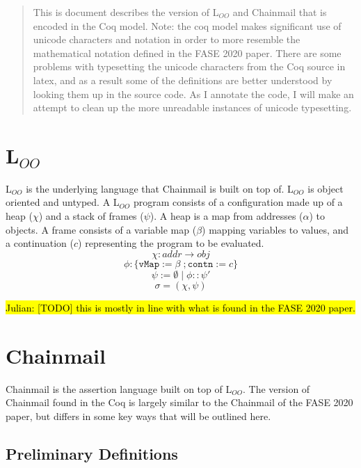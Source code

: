 \documentclass[12pt]{article}
\begin{document}
\maketitle

\begin{abstract}
This is document describes the version of L$_{OO}$ and Chainmail that is encoded in the Coq model.  
Note: the coq model makes significant use of unicode characters and notation in order to more resemble
the mathematical notation defined in the FASE 2020 paper. There are some problems with typesetting the
unicode characters from the Coq source in latex, and as a result some of the definitions are better understood by looking them up 
in the source code. As I annotate the code, I will make an attempt to clean up the more unreadable instances 
of unicode typesetting.
\end{abstract}

\section{L$_{OO}$}

L$_{OO}$ is the underlying language that Chainmail is built on top of. L$_{OO}$ is object oriented and untyped.
A  L$_{OO}$ program consists of a configuration made up of a heap ($\chi$) and a stack of frames ($\psi$).
A heap is a map from addresses ($\alpha$) to objects. A frame consists of a variable map ($\beta$) mapping variables
to values, and a continuation ($c$) representing the program to be evaluated.
\[
\chi : addr \rightarrow obj
\]
\[
\phi : \{\texttt{vMap}:= \beta\; ; \texttt{contn} := c\}
\]
\[
\psi := \emptyset\; |\; \phi :: \psi'
\]
\[
\sigma = (\chi, \psi)
\]

\hl{Julian: [TODO] this is mostly in line with what is found in the FASE 2020 paper.}

\section{Chainmail}

Chainmail is the assertion language built on top of L$_{OO}$. The version of Chainmail found in the Coq is largely similar to 
the Chainmail of the FASE 2020 paper, but differs in some key ways that will be outlined here.

\subsection{Preliminary Definitions}
\end{document}
